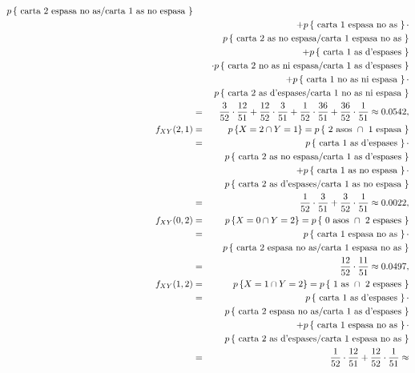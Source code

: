 {\begin{eqnarray*}
	\pp{\mbox{ carta 2 espasa no as/carta 1 as no espasa }} \\ & & 
	+ \pp{\mbox{ carta 1 espasa no as }}\cdot \\ &&
        \pp{\mbox{ carta 2 as no espasa/carta 1 espasa no as }} \\  & &
 	  + \pp{\mbox{ carta 1 as d'espases }} \\ &&
	  \cdot \pp{\mbox{ carta 2 no as ni espasa/carta 1 as d'espases }}
	 \\ & & 
	  + \pp{\mbox{ carta 1  no as ni espasa }}\cdot \\ &&
	   \pp{\mbox{ carta 2 as d'espases/carta 1 no as ni espasa }} 
	 \\ & = & 
	   \frac{3}{52}\cdot\frac{12}{51}+\frac{12}{52}\cdot\frac{3}{51}+ 
	   \frac{1}{52}\cdot\frac{36}{51}+\frac{36}{52}\cdot\frac{1}{51}\approx 
	   0.0542, \\ 
	   f_{XY}(2,1) & = & \pp{ X=2\cap Y=1} = 
	  \pp{\mbox{ 2 asos }\cap\mbox{ 1 espasa }} \\ & = & 
	  \pp{\mbox{ carta 1 as d'espases }}\cdot \\ &&
	   \pp{\mbox{ carta 2 as no espasa/carta 1 as d'espases }} 
	  \\ & & + 
	   \pp{\mbox{ carta 1 as no espasa }} 
	   \cdot \\ && 
	  \pp{\mbox{ carta 2 as d'espases/carta 1 as no espasa }} \\
	   & = & \frac{1}{52}\cdot\frac{3}{51}+\frac{3}{52}\cdot 
	   \frac{1}{51}\approx 0.0022, \\ 
	   f_{XY}(0,2) & = & \pp{ X=0\cap Y=2}= 
 	  \pp{\mbox{ 0 asos }\cap\mbox{ 2 espases }} \\
	   & = & \pp{\mbox{ carta 1 espasa no as }}\cdot \\ && 
	  \pp{\mbox{ carta 2 espasa no as/carta 1 espasa no as }} 
	  \\ & = &
	   \frac{12}{52}\cdot\frac{11}{51}\approx 0.0497, \\ 
	   f_{XY}(1,2) & = & \pp{ X=1\cap Y=2}= \pp{\mbox{ 1 as }\cap
	\mbox{ 2 espases }}\\ & = & \pp{\mbox{ carta 1 as d'espases }}
	\cdot \\ && \pp{\mbox{ carta 2 espasa no as/carta 1 as d'espases }}
	\\ & & + \pp{\mbox{ carta 1 espasa no as }}\cdot \\ &&
	   \pp{\mbox{ carta 2 as d'espases/carta 1 espasa no as }}
	 \\ & = & 
	   \frac{1}{52}\cdot\frac{12}{51}+\frac{12}{52}\cdot\frac{1}{51}\approx 

\end{eqnarray*}}
